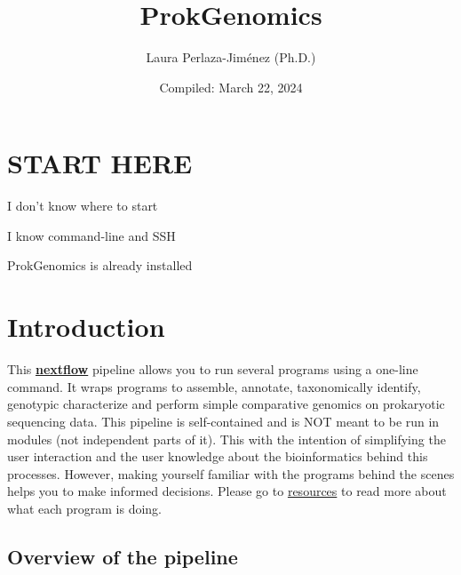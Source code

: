 \documentclass[
]{book}
\title{ProkGenomics}
\author{Laura Perlaza-Jiménez (Ph.D.)}
\date{Compiled: March 22, 2024}
\begin{document}
\maketitle

{
\setcounter{tocdepth}{1}
\tableofcontents
}
\hypertarget{start-here}{%
\chapter{START HERE}\label{start-here}}

{I don't know where to start}

{I know command-line and SSH}

{ProkGenomics is already installed }

\hypertarget{introduction}{%
\chapter{Introduction}\label{introduction}}

This \textbf{\href{https://www.nextflow.io/}{nextflow}} pipeline allows you to run several programs using a one-line command. It wraps programs to assemble, annotate, taxonomically identify, genotypic characterize and perform simple comparative genomics on prokaryotic sequencing data. This pipeline is self-contained and is NOT meant to be run in modules (not independent parts of it). This with the intention of simplifying the user interaction and the user knowledge about the bioinformatics behind this processes. However, making yourself familiar with the programs behind the scenes helps you to make informed decisions. Please go to \href{resources.html}{resources} to read more about what each program is doing.

\hypertarget{overview-of-the-pipeline}{%
\section{Overview of the pipeline}\label{overview-of-the-pipeline}}
\end{document}
